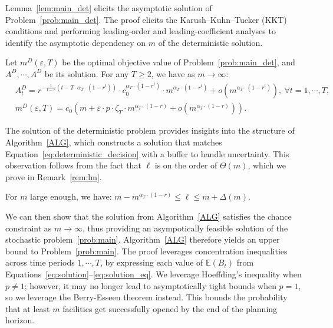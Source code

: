 \documentclass[nonblindrev]{informs3noheader}
\def\E{\mathbb{E}}
\begin{document}
Lemma~\ref{lem:main_det} elicits the asymptotic solution of Problem~\eqref{prob:main_det}. The proof elicits the Karush–Kuhn–Tucker (KKT) conditions and performing leading-order and leading-coefficient analyses to identify the asymptotic dependency on $m$ of the deterministic solution.

\begin{lemma}\label{lem:main_det}
Let $m^D(\varepsilon, T)$ be the optimal objective value of Problem~\eqref{prob:main_det}, and $A^D,\cdots, A^D$ be its solution. For any $T\geq 2$, we have as $m \to \infty$: 
\begin{align}
       & A^D_t = r^{-\frac{1}{1-r}\left(t-T\cdot\alpha_T\cdot(1-r^t)\right)}\cdot c_0^{\alpha_T\cdot(1-r^t)}\cdot m^{\alpha_T\cdot(1-r^t)}+ o\left(m^{\alpha_T\cdot(1-r^t)}\right),\ \forall t=1,\cdots,T,\label{eq:deterministic_decision}\\
       &m^D(\varepsilon, T) = c_0\left( m+\varepsilon\cdot p\cdot \zeta_T \cdot m^{\alpha_T\cdot(1-r)} +  o\left(m^{\alpha_T\cdot(1-r)}\right)\right).\label{eq:deterministic_solution}
\end{align}
\end{lemma}

The solution of the deterministic problem provides insights into the structure of Algorithm~\ref{ALG}, which constructs a solution that matches Equation~\eqref{eq:deterministic_decision} with a buffer to handle uncertainty. This observation follows from the fact that $\ell$ is on the order of $\Theta(m)$, which we prove in Remark~\ref{rem:lm}.
\begin{remark}\label{rem:lm}
     For $m$ large enough, we have: $m- m^{\alpha_T \cdot (1-r)} \leq \ell\leq m + \Delta(m)$.
\end{remark}

We can then show that the solution from Algorithm~\ref{ALG} satisfies the chance constraint as $m\to\infty$, thus providing an asympotically feasible solution of the stochastic problem~\eqref{prob:main}. Algorithm~\ref{ALG} therefore yields an upper bound to Problem~\eqref{prob:main}. The proof leverages concentration inequalities across time periods $1,\cdots,T$, by expressing each value of $\E(B_t)$ from Equations~\eqref{eq:solution}--\eqref{eq:solution_eq}. We leverage Hoeffding's inequality when $p\neq 1$; however, it may no longer lead to asymptotically tight bounds when $p=1$, so we leverage the Berry-Esseen theorem instead. This bounds the probability that at least $m$ facilities get successfully opened by the end of the planning horizon.
\end{document}
